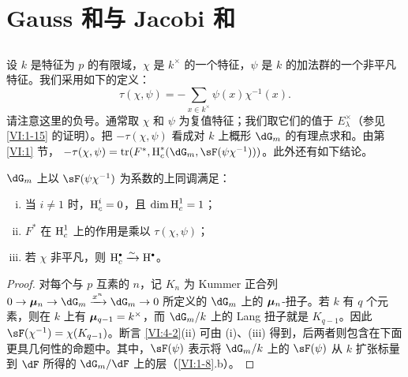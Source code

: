 \section{Gauss 和与 Jacobi 和}\label{VI:4}

\subsection{}\label{VI:4-1}
设 $k$ 是特征为 $p$ 的有限域，$\chi$ 是 $k^\times$ 的一个特征，$\psi$ 是 $k$ 的加法群的一个非平凡特征。我们采用如下的定义：
\begin{equation*}\tag{4.1.1}\label{VI:eq:4-1-1}
  \tau(\chi,\psi)=-\sum_{x\in k^\times}\psi(x)\chi^{-1}(x).
\end{equation*}
请注意这里的负号。通常取 $\chi$ 和 $\psi$ 为复值特征；我们取它们的值于 $E_\lambda^\times$（参见 \ref{VI:1-15} 的证明）。把 $-\tau(\chi,\psi)$ 看成对 $k$ 上概形 $\dG_m$ 的有理点求和。由第 \ref{VI:1} 节，
$-\tau(\chi,\psi)=\tr(F^\ast,\h_c^\ast(\dG_m,\sF(\psi\chi^{-1})))$。此外还有如下结论。

\begin{proposition_}\label{VI:4-2}
$\dG_m$ 上以 $\sF(\psi\chi^{-1})$ 为系数的上同调满足：
\begin{enumerate}[(i)]
\item 当 $i\ne1$ 时，$\operatorname{H}_c^i=0$，且 $\dim\operatorname{H}_c^1=1$；
\item $F^\ast$ 在 $\operatorname{H}_c^1$ 上的作用是乘以 $\tau(\chi,\psi)$；
\item 若 $\chi$ 非平凡，则 $\h_c^\bullet\iso\h^\bullet$。
\end{enumerate}
\end{proposition_}
\begin{proof}
对每个与 $p$ 互素的 $n$，记 $K_n$ 为 Kummer 正合列
$0\to\dmu_n\to\dG_m\xrightarrow{x^n}\dG_m\to0$
所定义的 $\dG_m$ 上的 ${\bm\mu}_n$-扭子。若 $k$ 有 $q$ 个元素，则在 $k$ 上有 ${\bm\mu}_{q-1}=k^\times$，而 $\dG_m/k$ 上的 Lang 扭子就是 $K_{q-1}$。因此 $\sF(\chi^{-1})=\chi(K_{q-1})$。断言 \ref{VI:4-2}(ii) 可由 (i)、(iii) 得到，后两者则包含在下面更具几何性的命题中。其中，$\sF(\psi)$ 表示将 $\dG_m/k$ 上的 $\sF(\psi)$ 从 $k$ 扩张标量到 $\dF$ 所得的 $\dG_m/\dF$ 上的层（\ref{VI:1-8}.b）。
\end{proof}

